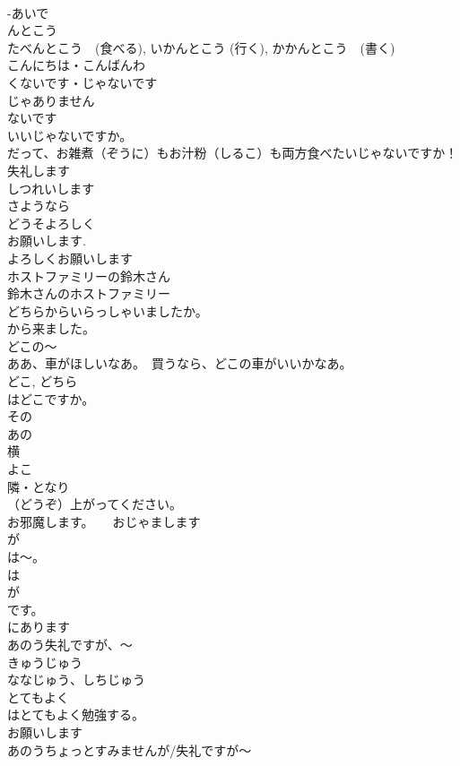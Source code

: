 \documentclass[8pt]{extreport}
\begin{document}
\begin{CJK}{UTF8}{min}
\\	-あいで
\\	んとこう
\\	たべんとこう　(食べる), いかんとこう (行く), かかんとこう　(書く)
\\	こんにちは・こんばんわ
\\	くないです・じゃないです
\\	じゃありません
\\	ないです 
\\	いいじゃないですか。
\\	だって、お雑煮（ぞうに）もお汁粉（しるこ）も両方食べたいじゃないですか！
\\	失礼します
\\	しつれいします 
\\	さようなら 
\\	どうそよろしく
\\	お願いします.
\\	よろしくお願いします 
\\	ホストファミリーの鈴木さん
\\	鈴木さんのホストファミリー
\\	どちらからいらっしゃいましたか。
\\	から来ました。
\\	どこの～
\\	ああ、車がほしいなあ。　買うなら、どこの車がいいかなあ。
\\	どこ, どちら
\\	はどこですか。	
\\	その
\\	あの 
\\	横
\\	よこ 
\\	隣・となり 
\\	（どうぞ）上がってください。
\\	お邪魔します。　　おじゃまします
\\	が
\\	は～。
\\	は 
\\	が 
\\	です。
\\	にあります 
\\	あのう失礼ですが、～
\\	きゅうじゅう
\\	ななじゅう、しちじゅう	
\\	とてもよく
\\	はとてもよく勉強する。
\\	お願いします
\\	あのうちょっとすみませんが/失礼ですが～ 

\end{CJK}
\end{document}

